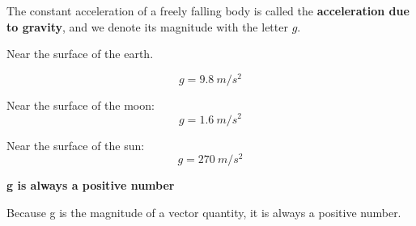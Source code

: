 \documentclass[]{beamer}
\begin{document}


\begin{frame}
    The constant acceleration of a freely falling body is called the \textbf{acceleration
    due to gravity}, and we denote its magnitude with the letter $g$.
    \vspace{3mm}
    
    Near the surface of the earth.
    \pause

    \begin{equation}
    g=9.8~m/s^ 2
    \end{equation}
    
    \pause

  

    Near the surface of the moon:
    \pause
    \begin{equation}
        g=1.6~m/s^ 2
        \end{equation}
        
        \pause

  

        Near the surface of the sun:
        \pause
        \begin{equation}
            g=270~m/s^ 2
            \end{equation}
    
      
    
     \end{frame}





\begin{frame}
   \textbf{g is always a positive number}  
   \vspace{3mm}


   Because g is the magnitude of a vector quantity,
    it is always a positive number.
     \end{frame}

\end{document}
